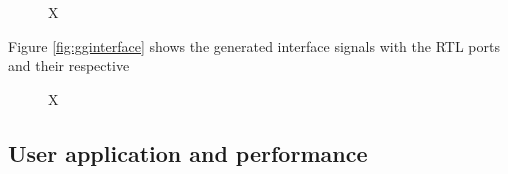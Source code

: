 \begin{figure}[htbp]
	\centering
	\caption{X}
	\label{fig:simutilizationestimates}
\end{figure}

Figure \ref{fig:gginterface} shows the generated interface signals with the RTL ports and their respective

\begin{figure}[htbp]
	\centering
	\caption{X}
	\label{fig:siminterface}
\end{figure}

\subsection{User application and performance}




